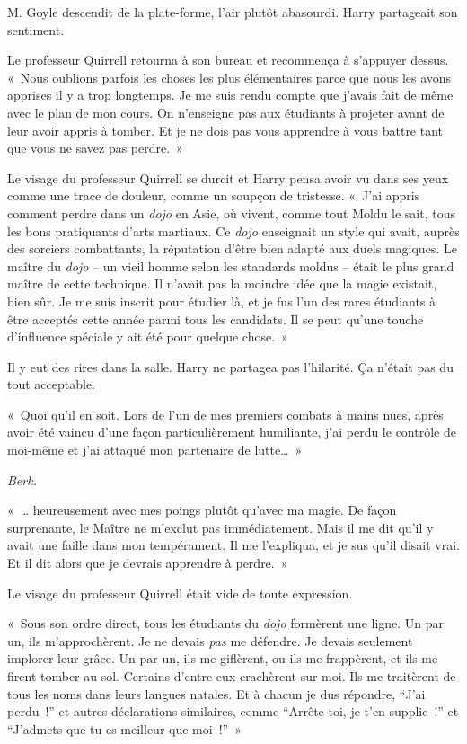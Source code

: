 M. Goyle descendit de la plate-forme, l'air plutôt abasourdi. Harry partageait son sentiment.

Le professeur Quirrell retourna à son bureau et recommença à s'appuyer dessus. «~Nous oublions parfois les choses les plus élémentaires parce que nous les avons apprises il y a trop longtemps. Je me suis rendu compte que j'avais fait de même avec le plan de mon cours. On n'enseigne pas aux étudiants à projeter avant de leur avoir appris à tomber. Et je ne dois pas vous apprendre à vous battre tant que vous ne savez pas perdre.~»

Le visage du professeur Quirrell se durcit et Harry pensa avoir vu dans ses yeux comme une trace de douleur, comme un soupçon de tristesse. «~J'ai appris comment perdre dans un \emph{dojo} en Asie, où vivent, comme tout Moldu le sait, tous les bons pratiquants d'arts martiaux. Ce \emph{dojo} enseignait un style qui avait, auprès des sorciers combattants, la réputation d'être bien adapté aux duels magiques. Le maître du \emph{dojo} -- un vieil homme selon les standards moldus -- était le plus grand maître de cette technique. Il n'avait pas la moindre idée que la magie existait, bien sûr. Je me suis inscrit pour étudier là, et je fus l'un des rares étudiants à être acceptés cette année parmi tous les candidats. Il se peut qu'une touche d'influence spéciale y ait été pour quelque chose.~»

Il y eut des rires dans la salle. Harry ne partagea pas l'hilarité. Ça n'était pas du tout acceptable.

«~Quoi qu'il en soit. Lors de l'un de mes premiers combats à mains nues, après avoir été vaincu d'une façon particulièrement humiliante, j'ai perdu le contrôle de moi-même et j'ai attaqué mon partenaire de lutte…~»

\emph{Berk.}

«~… heureusement avec mes poings plutôt qu'avec ma magie. De façon surprenante, le Maître ne m'exclut pas immédiatement. Mais il me dit qu'il y avait une faille dans mon tempérament. Il me l'expliqua, et je sus qu'il disait vrai. Et il dit alors que je devrais apprendre à perdre.~»

Le visage du professeur Quirrell était vide de toute expression.

«~Sous son ordre direct, tous les étudiants du \emph{dojo} formèrent une ligne. Un par un, ils m'approchèrent. Je ne devais \emph{pas} me défendre. Je devais seulement implorer leur grâce. Un par un, ils me giflèrent, ou ils me frappèrent, et ils me firent tomber au sol. Certains d'entre eux crachèrent sur moi. Ils me traitèrent de tous les noms dans leurs langues natales. Et à chacun je dus répondre, “J'ai perdu~!” et autres déclarations similaires, comme “Arrête-toi, je t'en supplie~!” et “J'admets que tu es meilleur que moi~!”~»

